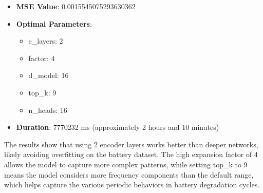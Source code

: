 \begin{itemize}
    \item \textbf{MSE Value}: 0.0015545075293630362
    \item \textbf{Optimal Parameters}:
    \begin{itemize}
        \item e\_layers: 2
        \item factor: 4  
        \item d\_model: 16
        \item top\_k: 9
        \item n\_heads: 16
    \end{itemize}
    \item \textbf{Duration}: 7770232 ms (approximately 2 hours and 10 minutes)
\end{itemize}

The results show that using 2 encoder layers works better than deeper networks, likely avoiding overfitting on the battery dataset. The high expansion factor of 4 allows the model to capture more complex patterns, while setting top\_k to 9 means the model considers more frequency components than the default range, which helps capture the various periodic behaviors in battery degradation cycles.

